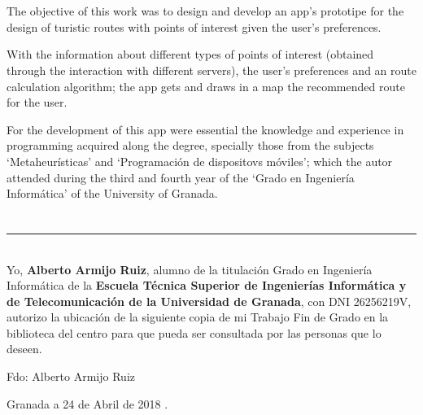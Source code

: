\\

\vspace{0.7cm}
\\
The objective of this work was to design and develop an app's prototipe for the design of turistic routes with points of interest given the user's preferences.\newline

With the information about different types of points of interest (obtained through the interaction with different servers), the user's preferences and an route calculation algorithm; the app gets and draws in a map the recommended route for the user.\newline

For the development of this app were essential the knowledge and experience in programming acquired along the degree, specially those from the subjects \enquote*{Metaheurísticas} and \enquote*{Programación de dispositovs móviles}; which the autor attended during the third and fourth year of the \enquote*{Grado en Ingeniería Informática} of the University of Granada.

\chapter*{}
\thispagestyle{empty}

\noindent\rule[-1ex]{\textwidth}{2pt}\\[4.5ex]

Yo, \textbf{Alberto Armijo Ruiz}, alumno de la titulación Grado en Ingeniería Informática de la \textbf{Escuela Técnica Superior
de Ingenierías Informática y de Telecomunicación de la Universidad de Granada}, con DNI 26256219V, autorizo la
ubicación de la siguiente copia de mi Trabajo Fin de Grado en la biblioteca del centro para que pueda ser
consultada por las personas que lo deseen.

\vspace{6cm}

\noindent Fdo: Alberto Armijo Ruiz

\vspace{2cm}

\begin{flushright}
Granada a 24 de Abril de 2018 .
\end{flushright}


\chapter*{}
\thispagestyle{empty}

